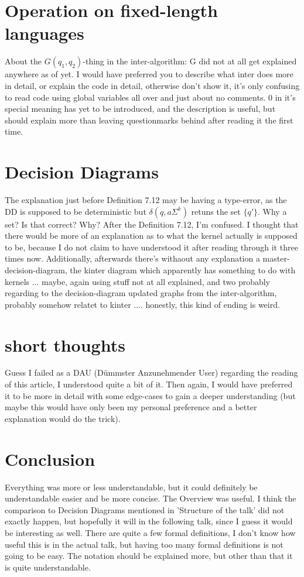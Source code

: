 \documentclass{scrartcl}
\begin{document}
\section*{Operation on fixed-length languages}
About the $G(q_1, q_2)$-thing in the inter-algorithm: G did not at all get
explained anywhere as of yet. I would have preferred you to describe what inter
does more in detail, or explain the code in detail, otherwise don't show it,
it's only confusing to read code using global variables all over and just about
no comments. 0 in it's special meaning has yet to be introduced, and the
description is useful, but should explain more than leaving questionmarks
behind after reading it the first time.

\section*{Decision Diagrams}
The explanation just before Definition 7.12 may be having a type-error, as the
DD is supposed to be deterministic but $\delta(q, a\Sigma^k)$ retuns the set
$\{q'\}$. Why a set? Is that correct? Why? After the Definition 7.12, I'm
confused. I thought that there would be more of an explanation as to what the
kernel actually is supposed to be, because I do not claim to have understood it
after reading through it three times now. Additionally, afterwards there's
withaout any explanation a master-decision-diagram, the kinter diagram which
apparently has something to do with kernels ... maybe, again using stuff not at
all explained, and two probably regarding to the decision-diagram updated
graphs from the inter-algorithm, probably somehow relatet to kinter ....
honestly, this kind of ending is weird.

\section*{short thoughts}
Guess I failed as a DAU (Dümmster Anzunehmender User) regarding the reading of
this article, I understood quite a bit of it. Then again, I would have
preferred it to be more in detail with some edge-cases to gain a deeper
understanding (but maybe this would have only been my personal preference and a
better explanation would do the trick).

\section*{Conclusion}
Everything was more or less understandable, but it could definitely be
understandable easier and be more concise. The Overview was useful. I think the
comparison to Decision Diagrams mentioned in 'Structure of the talk' did not
exactly happen, but hopefully it will in the following talk, since I guess it
would be interesting as well. There are quite a few formal definitions, I don't
know how useful this is in the actual talk, but having too many formal
definitions is not going to be easy. The notation should be explained more, but
other than that it is quite understandable.
\end{document}
